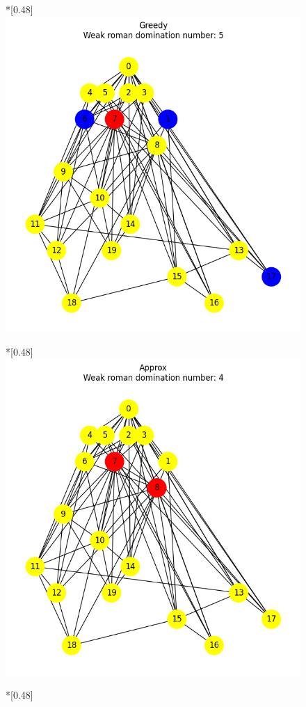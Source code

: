 \begin{figure}[htbp]
        \begin{subcaptionbox}*{}[0.48\linewidth]
            {\includegraphics[width=0.75\linewidth]{assets/plots/Greedy/ScaleFree_n20_i2_results.png}}
        \end{subcaptionbox}
        \hfill
        \begin{subcaptionbox}*{}[0.48\linewidth]
            {\includegraphics[width=0.75\linewidth]{assets/plots/Approx/ScaleFree_n20_i2_results.png}}
        \end{subcaptionbox}
        \hfill
        \begin{subcaptionbox}*{}[0.48\linewidth]

\end{subcaptionbox}
\end{figure}
